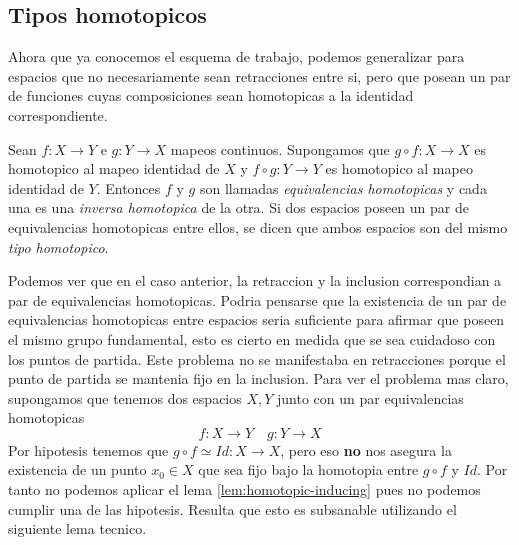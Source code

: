 \subsection{Tipos homotopicos}
Ahora que ya conocemos el esquema de trabajo, podemos generalizar para
espacios que no necesariamente sean retracciones entre si, pero que
posean un par de funciones cuyas composiciones sean homotopicas a la
identidad correspondiente.
\begin{definicion}
  Sean \(f : X \to Y\) e \(g : Y \to X\) mapeos continuos. Supongamos
  que \( g \circ f : X \to X \) es homotopico al mapeo identidad de
  \(X\) y \( f \circ g : Y \to Y \) es homotopico al mapeo identidad de
  \(Y\). Entonces \(f\) y \(g\) son llamadas \emph{equivalencias
  homotopicas} y cada una es una \emph{inversa homotopica} de la otra.
  Si dos espacios poseen un par de equivalencias homotopicas entre ellos,
  se dicen que ambos espacios son del mismo \emph{tipo homotopico}.
\end{definicion}
Podemos ver que en el caso anterior, la retraccion y la inclusion
correspondian a par de equivalencias homotopicas. Podria pensarse que la
existencia de un par de equivalencias homotopicas entre espacios seria
suficiente para afirmar que poseen el mismo grupo fundamental, esto es
cierto en medida que se sea cuidadoso con los puntos de partida. Este
problema no se manifestaba en retracciones porque el punto de partida se
mantenia fijo en la inclusion. Para ver el problema mas claro,
supongamos que tenemos dos espacios \(X, Y\) junto con un par
equivalencias homotopicas
\[ f : X \to Y \quad g : Y \to X \]
Por hipotesis tenemos que \(g \circ f \simeq Id : X \to X\), pero eso
\textbf{no} nos asegura la existencia de un punto \(x_0 \in X\) que sea
fijo bajo la homotopia entre \( g \circ f\) y \(Id\). Por tanto no
podemos aplicar el lema \ref{lem:homotopic-inducing} pues no podemos
cumplir una de las hipotesis. Resulta que esto es subsanable utilizando
el siguiente lema tecnico.

